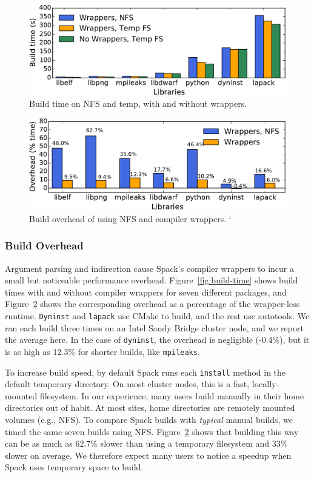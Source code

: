 \begin{figure}%
	\centering
	\includegraphics[width=.95\columnwidth]{figs/overhead/build-time.pdf}
	\caption{
		Build time on NFS and temp, with and without wrappers.
		\label{fig:build-times}
	}
\end{figure}
\begin{figure}%
	\centering
	\includegraphics[width=.95\columnwidth]{figs/overhead/overhead.pdf}
	\caption{
		Build overhead of using NFS and compiler wrappers.
		\label{fig:overhead}`
	}
\end{figure}

\subsubsection{Build Overhead}

Argument parsing and indirection cause Spack's compiler wrappers to incur a small
but noticeable performance overhead.  Figure~\ref{fig:build-time} shows
build times with and without compiler wrappers for seven different packages,
and Figure~\ref{fig:overhead} shows the corresponding overhead as a percentage
of the wrapper-less runtime.  {\tt Dyninst} and {\tt lapack}
use CMake to build, and the rest use autotools.  We ran
each build three times on an Intel Sandy Bridge cluster node, and we
report the average here.
In the case of {\tt dyninst}, the overhead is negligible (-0.4\%),
but it is as high as 12.3\% for shorter builds, like
{\tt mpileaks}.

To increase build speed, by default Spack runs each {\tt install}
method in the default temporary directory. On most cluster nodes,
this is a fast, locally-mounted filesystem. In our experience,
many users build manually in their home directories out of habit.  At most sites, home
directories are remotely mounted volumes (e.g., NFS).  To compare Spack builds
with {\it typical} manual builds, we timed the same seven builds using
NFS.  Figure~\ref{fig:overhead} shows that building this way can be as much
as 62.7\% slower than using a temporary filesystem and
33\% slower on average. We therefore expect many users to notice
a speedup when Spack uses temporary space to build.


